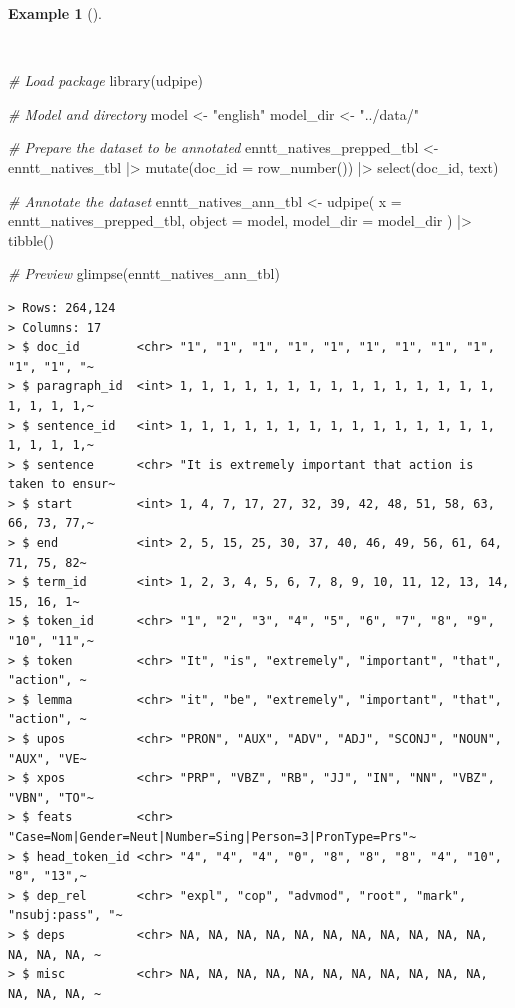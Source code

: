 \documentclass[
  letterpaper,
]{latex/krantz}
\newenvironment{Shaded}{\begin{snugshade}}{\end{snugshade}}
\newcommand{\AttributeTok}[1]{\textcolor[rgb]{0.00,0.00,0.00}{#1}}
\newcommand{\CommentTok}[1]{\textcolor[rgb]{0.00,0.00,0.00}{\textit{#1}}}
\newcommand{\FunctionTok}[1]{\textcolor[rgb]{0.00,0.00,0.00}{#1}}
\newcommand{\NormalTok}[1]{\textcolor[rgb]{0.00,0.00,0.00}{#1}}
\newcommand{\OtherTok}[1]{\textcolor[rgb]{0.00,0.00,0.00}{#1}}
\newcommand{\SpecialCharTok}[1]{\textcolor[rgb]{0.00,0.00,0.00}{#1}}
\newcommand{\StringTok}[1]{\textcolor[rgb]{0.00,0.00,0.00}{#1}}
\theoremstyle{definition}
\newtheorem{example}{Example}[chapter]
\theoremstyle{remark}
\begin{document}
\begin{example}[]\protect\hypertarget{exm-td-generation-udpipe-natives}{}\label{exm-td-generation-udpipe-natives}

~

\begin{Shaded}
\begin{Highlighting}[]
\CommentTok{\# Load package}
\FunctionTok{library}\NormalTok{(udpipe)}

\CommentTok{\# Model and directory}
\NormalTok{model }\OtherTok{\textless{}{-}} \StringTok{"english"}
\NormalTok{model\_dir }\OtherTok{\textless{}{-}} \StringTok{"../data/"}

\CommentTok{\# Prepare the dataset to be annotated}
\NormalTok{enntt\_natives\_prepped\_tbl }\OtherTok{\textless{}{-}}
\NormalTok{  enntt\_natives\_tbl }\SpecialCharTok{|\textgreater{}}
  \FunctionTok{mutate}\NormalTok{(}\AttributeTok{doc\_id =} \FunctionTok{row\_number}\NormalTok{()) }\SpecialCharTok{|\textgreater{}}
  \FunctionTok{select}\NormalTok{(doc\_id, text)}

\CommentTok{\# Annotate the dataset}
\NormalTok{enntt\_natives\_ann\_tbl }\OtherTok{\textless{}{-}}
  \FunctionTok{udpipe}\NormalTok{(}
    \AttributeTok{x =}\NormalTok{ enntt\_natives\_prepped\_tbl,}
    \AttributeTok{object =}\NormalTok{ model,}
    \AttributeTok{model\_dir =}\NormalTok{ model\_dir}
\NormalTok{  ) }\SpecialCharTok{|\textgreater{}}
  \FunctionTok{tibble}\NormalTok{()}

\CommentTok{\# Preview}
\FunctionTok{glimpse}\NormalTok{(enntt\_natives\_ann\_tbl)}
\end{Highlighting}
\end{Shaded}

\begin{verbatim}
> Rows: 264,124
> Columns: 17
> $ doc_id        <chr> "1", "1", "1", "1", "1", "1", "1", "1", "1", "1", "1", "~
> $ paragraph_id  <int> 1, 1, 1, 1, 1, 1, 1, 1, 1, 1, 1, 1, 1, 1, 1, 1, 1, 1, 1,~
> $ sentence_id   <int> 1, 1, 1, 1, 1, 1, 1, 1, 1, 1, 1, 1, 1, 1, 1, 1, 1, 1, 1,~
> $ sentence      <chr> "It is extremely important that action is taken to ensur~
> $ start         <int> 1, 4, 7, 17, 27, 32, 39, 42, 48, 51, 58, 63, 66, 73, 77,~
> $ end           <int> 2, 5, 15, 25, 30, 37, 40, 46, 49, 56, 61, 64, 71, 75, 82~
> $ term_id       <int> 1, 2, 3, 4, 5, 6, 7, 8, 9, 10, 11, 12, 13, 14, 15, 16, 1~
> $ token_id      <chr> "1", "2", "3", "4", "5", "6", "7", "8", "9", "10", "11",~
> $ token         <chr> "It", "is", "extremely", "important", "that", "action", ~
> $ lemma         <chr> "it", "be", "extremely", "important", "that", "action", ~
> $ upos          <chr> "PRON", "AUX", "ADV", "ADJ", "SCONJ", "NOUN", "AUX", "VE~
> $ xpos          <chr> "PRP", "VBZ", "RB", "JJ", "IN", "NN", "VBZ", "VBN", "TO"~
> $ feats         <chr> "Case=Nom|Gender=Neut|Number=Sing|Person=3|PronType=Prs"~
> $ head_token_id <chr> "4", "4", "4", "0", "8", "8", "8", "4", "10", "8", "13",~
> $ dep_rel       <chr> "expl", "cop", "advmod", "root", "mark", "nsubj:pass", "~
> $ deps          <chr> NA, NA, NA, NA, NA, NA, NA, NA, NA, NA, NA, NA, NA, NA, ~
> $ misc          <chr> NA, NA, NA, NA, NA, NA, NA, NA, NA, NA, NA, NA, NA, NA, ~
\end{verbatim}


\end{example}
\end{document}
